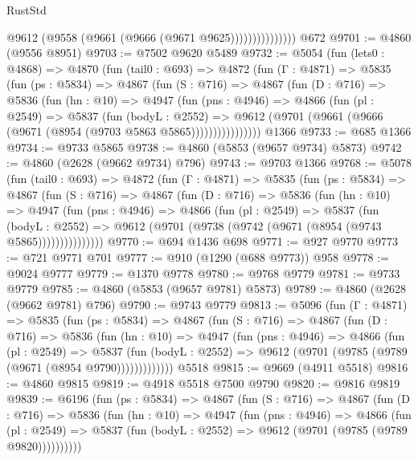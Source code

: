 \begin{lexlean}{RustStd}
\begin{coremodule}
                        @9612 (@9558 (@9661 (@9666 (@9671 @9625)))))))))))))))
    @672
@9701 := @4860 (@9556 @8951)
@9703 := @7502 @9620 @5489
@9732 := @5054
    (fun (lets0 : @4868) =>
    @4870
      (fun (tail0 : @693) =>
      @4872
        (fun (Γ : @4871) =>
        @5835
          (fun (ps : @5834) =>
          @4867
            (fun (S : @716) =>
            @4867
              (fun (D : @716) =>
              @5836
                (fun (hn : @10) =>
                @4947
                  (fun (pns : @4946) =>
                  @4866
                    (fun (pl : @2549) =>
                    @5837
                      (fun (bodyL : @2552) =>
                      @9612 (@9701 (@9661 (@9666 (@9671 (@8954 (@9703 @5863 @5865))))))))))))))))
    @1366
@9733 := @685 @1366
@9734 := @9733 @5865
@9738 := @4860 (@5853 (@9657 @9734) @5873)
@9742 := @4860 (@2628 (@9662 @9734) @796)
@9743 := @9703 @1366
@9768 := @5078
    (fun (tail0 : @693) =>
    @4872
      (fun (Γ : @4871) =>
      @5835
        (fun (ps : @5834) =>
        @4867
          (fun (S : @716) =>
          @4867
            (fun (D : @716) =>
            @5836
              (fun (hn : @10) =>
              @4947
                (fun (pns : @4946) =>
                @4866
                  (fun (pl : @2549) =>
                  @5837
                    (fun (bodyL : @2552) =>
                    @9612 (@9701 (@9738 (@9742 (@9671 (@8954 (@9743 @5865)))))))))))))))
@9770 := @694 @1436 @698
@9771 := @927 @9770
@9773 := @721 @9771 @701
@9777 := @910 (@1290 (@688 @9773)) @958
@9778 := @9024 @9777
@9779 := @1370 @9778
@9780 := @9768 @9779
@9781 := @9733 @9779
@9785 := @4860 (@5853 (@9657 @9781) @5873)
@9789 := @4860 (@2628 (@9662 @9781) @796)
@9790 := @9743 @9779
@9813 := @5096
    (fun (Γ : @4871) =>
    @5835
      (fun (ps : @5834) =>
      @4867
        (fun (S : @716) =>
        @4867
          (fun (D : @716) =>
          @5836
            (fun (hn : @10) =>
            @4947
              (fun (pns : @4946) =>
              @4866
                (fun (pl : @2549) =>
                @5837
                  (fun (bodyL : @2552) =>
                  @9612 (@9701 (@9785 (@9789 (@9671 (@8954 @9790)))))))))))))
    @5518
@9815 := @9669 (@4911 @5518)
@9816 := @4860 @9815
@9819 := @4918 @5518 @7500 @9790
@9820 := @9816 @9819
@9839 := @6196
    (fun (ps : @5834) =>
    @4867
      (fun (S : @716) =>
      @4867
        (fun (D : @716) =>
        @5836
          (fun (hn : @10) =>
          @4947
            (fun (pns : @4946) =>
            @4866
              (fun (pl : @2549) =>
              @5837 (fun (bodyL : @2552) => @9612 (@9701 (@9785 (@9789 @9820))))))))))

\end{coremodule}
\end{lexlean}

